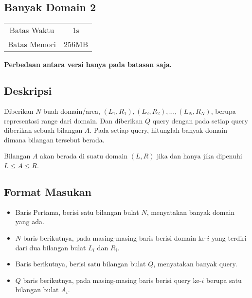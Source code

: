 \documentclass{article}
\begin{document}
\begin{center}
    \section*{Banyak Domain 2} %

    \begin{tabular}{ | c c | }
        \hline
        Batas Waktu  & 1s \\    %
        Batas Memori & 256MB \\  %
        \hline
    \end{tabular}
\end{center}

\begin{center}
    \textbf{Perbedaan antara versi hanya pada batasan saja.}
\end{center}

\subsection*{Deskripsi}

Diberikan $N$ buah domain/area, $(L_1, R_1), (L_2, R_2), …, (L_N, R_N)$, berupa representasi range dari domain. Dan diberikan $Q$ query dengan pada setiap query diberikan sebuah bilangan $A$.
Pada setiap query, hitunglah banyak domain dimana bilangan tersebut berada.

Bilangan $A$ akan berada di suatu domain $(L, R)$ jika dan hanya jika dipenuhi $L \leq A \leq R$.

\subsection*{Format Masukan}
\begin{itemize}
\item{Baris Pertama, berisi satu bilangan bulat $N$, menyatakan banyak domain yang ada.}

\item{$N$ baris berikutnya, pada masing-masing baris berisi domain ke-$i$ yang terdiri dari dua bilangan bulat $L_i$ dan $R_i$.}

\item{Baris berikutnya, berisi satu bilangan bulat $Q$, menyatakan banyak query.}

\item{$Q$ baris berikutnya, pada masing-masing baris berisi query ke-$i$ berupa satu bilangan bulat $A_i$.}

\end{itemize}
\end{document}
